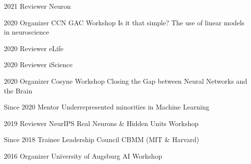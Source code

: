 {\block%
{%
2021%
}{%
}{%
Reviewer
}{%
Neuron
}{%
}{%
}

\block%
{%
2020%
}{%
}{%
Organizer
}{%
CCN GAC Workshop
}{%
Is it that simple? The use of linear models in neuroscience
}{%
}

\block%
{%
2020%
}{%
}{%
Reviewer
}{%
eLife
}{%
}{%
}

\block%
{%
2020%
}{%
}{%
Reviewer
}{%
iScience
}{%
}{%
}

\block%
{%
2020%
}{%
}{%
Organizer
}{%
Cosyne Workshop
}{%
Closing the Gap between Neural Networks and the Brain
}{%
}

\block%
{%
Since 2020
}{%
}{%
Mentor
}{%
Underrepresented minorities in Machine Learning  %
}{%
}{%
}

\block%
{%
2019%
}{%
}{%
Reviewer
}{%
NeurIPS Real Neurons \& Hidden Units Workshop
}{%
}{%
}

\block%
{%
Since 2018%
}{%
}{%
Trainee Leadership Council
}{%
CBMM (MIT \& Harvard)
}{%
}{%
}


\block%
{%
2016%
}{%
}{%
Organizer
}{%
University of Augsburg AI Workshop
}{%
}{%
}


}


